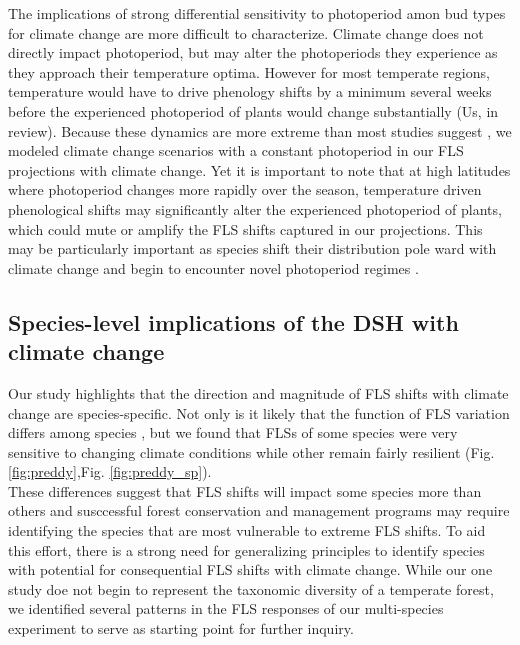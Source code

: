 \documentclass[11pt]{article}\usepackage[]{graphicx}\usepackage[]{color}
\begin{document}
\noindent The implications of strong differential sensitivity to photoperiod amon bud types for climate change are more difficult to characterize. Climate change does not directly impact photoperiod, but may alter the photoperiods they experience as they approach their temperature optima. However for most temperate regions, temperature would have to drive phenology shifts by a minimum several weeks before the experienced photoperiod of plants would change substantially \citep{}(Us, in review). Because these dynamics are more extreme than most studies suggest \citep{Thackeray:2016aa}, we modeled climate change scenarios with a constant photoperiod in our FLS projections with climate change. Yet it is important to note that at high latitudes where photoperiod changes more rapidly over the season, temperature driven phenological shifts may significantly alter the experienced photoperiod of plants, which could mute or amplify the FLS shifts captured in our projections. This may be particularly important as species shift their distribution pole ward with climate change and begin to encounter novel photoperiod regimes \citep{WAY:2015aa}.\\

\subsection*{Species-level implications of the DSH with climate change}
\noindent  Our study highlights that the direction and magnitude of FLS shifts with climate change are species-specific. Not only is it likely that the function of FLS variation differs among species \citep{Buonaiuto2020}, but we found that FLSs of some species were very sensitive to changing climate conditions while other remain fairly resilient (Fig. \ref{fig:preddy},Fig. \ref{fig:preddy_sp}).\\

\noident These differences suggest that FLS shifts will impact some species more than others and susccessful forest conservation and management programs may require identifying the species that are most vulnerable to extreme FLS shifts. To aid this effort, there is a strong need for generalizing principles to identify species with potential for consequential FLS shifts with climate change. While our one study doe not begin to represent the taxonomic diversity of a temperate forest, we identified several patterns in the FLS responses of our multi-species experiment to serve as starting point for further inquiry.\\ 
\end{document}
